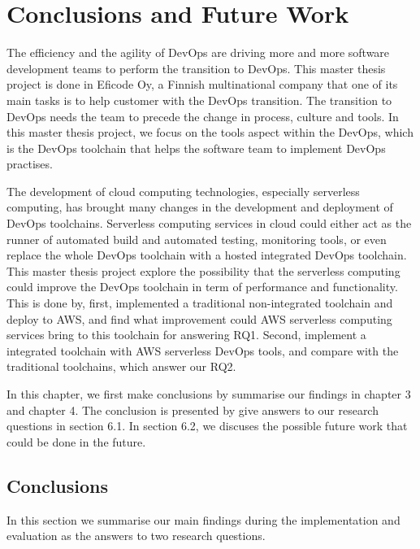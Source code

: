 \chapter{Conclusions and Future Work}
\label{chp:conclusionsandfuturework}
The efficiency and the agility of DevOps are driving more and more software development teams to perform the transition to DevOps. This master thesis project is done in Eficode Oy, a Finnish multinational company that one of its main tasks is to help customer with the DevOps transition. The transition to DevOps needs the team to precede the change in process, culture and tools. In this master thesis project, we focus on the tools aspect within the DevOps, which is the DevOps toolchain that helps the software team to implement DevOps practises. 

The development of cloud computing technologies, especially serverless computing, has brought many changes in the development and deployment of DevOps toolchains. Serverless computing services in cloud could either act as the runner of automated build and automated testing, monitoring tools, or even replace the whole DevOps toolchain with a hosted integrated DevOps toolchain. This master thesis project explore the possibility that the serverless computing could improve the DevOps toolchain in term of performance and functionality. This is done by, first, implemented a traditional non-integrated toolchain and deploy to AWS, and find what improvement could AWS serverless computing services bring to this toolchain for answering RQ1. Second, implement a integrated toolchain with AWS serverless DevOps tools, and compare with the traditional toolchains, which answer our RQ2. 

In this chapter, we first make conclusions by summarise our findings in chapter 3 and chapter 4. The conclusion is presented by give answers to our research questions in section 6.1. In section 6.2, we discuses the possible future work that could be done in the future.
\section{Conclusions}
In this section we summarise our main findings during the implementation and evaluation as the answers to two research questions.
